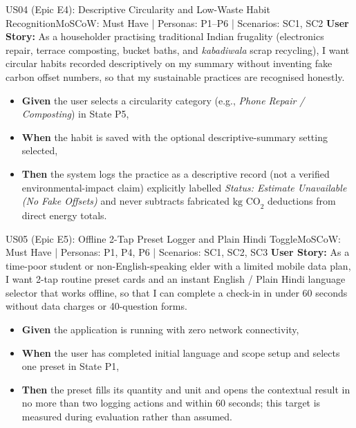 \documentclass[12pt, a4paper]{article}
\begin{document}
\begin{storybox}{US04 (Epic E4): Descriptive Circularity and Low-Waste Habit Recognition}{MoSCoW: Must Have | Personas: P1--P6 | Scenarios: SC1, SC2}
\textbf{User Story:} As a householder practising traditional Indian frugality (electronics repair, terrace composting, bucket baths, and \textit{kabadiwala} scrap recycling), I want circular habits recorded descriptively on my summary without inventing fake carbon offset numbers, so that my sustainable practices are recognised honestly.
\begin{itemize}
    \item \textbf{Given} the user selects a circularity category (e.g., \textit{Phone Repair / Composting}) in State P5,
    \item \textbf{When} the habit is saved with the optional descriptive-summary setting selected,
    \item \textbf{Then} the system logs the practice as a descriptive record (not a verified environmental-impact claim) explicitly labelled \textit{Status: Estimate Unavailable (No Fake Offsets)} and never subtracts fabricated $\text{kg CO}_2$ deductions from direct energy totals.
\end{itemize}
\end{storybox}

\begin{storybox}{US05 (Epic E5): Offline 2-Tap Preset Logger and Plain Hindi Toggle}{MoSCoW: Must Have | Personas: P1, P4, P6 | Scenarios: SC1, SC2, SC3}
\textbf{User Story:} As a time-poor student or non-English-speaking elder with a limited mobile data plan, I want 2-tap routine preset cards and an instant English / Plain Hindi language selector that works offline, so that I can complete a check-in in under 60 seconds without data charges or 40-question forms.
\begin{itemize}
    \item \textbf{Given} the application is running with zero network connectivity,
    \item \textbf{When} the user has completed initial language and scope setup and selects one preset in State P1,
    \item \textbf{Then} the preset fills its quantity and unit and opens the contextual result in no more than two logging actions and within 60 seconds; this target is measured during evaluation rather than assumed.
\end{itemize}
\end{storybox}
\end{document}
